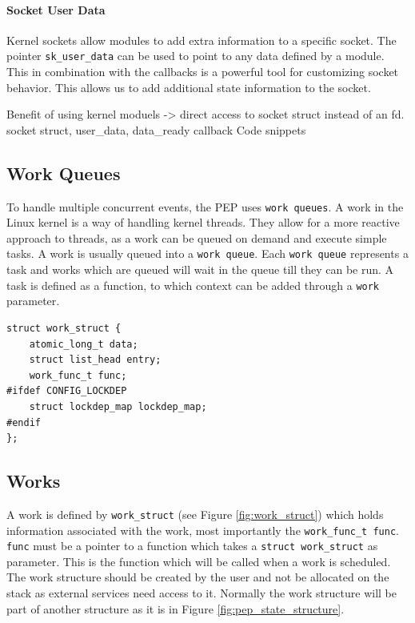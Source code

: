 \documentclass[a4paper,english, 11pt]{report}
\begin{document}
\paragraph{Socket User Data}
Kernel sockets allow modules to add extra information to a specific socket. The pointer \verb|sk_user_data| can be used to point to any data defined by a module. This in combination with the callbacks is a powerful tool for customizing socket behavior. This allows us to add additional state information to the socket.

Benefit of using kernel moduels -> direct access to socket struct instead of an fd.
socket struct, user\_data, data\_ready callback
Code snippets

\subsection{Work Queues}
To handle multiple concurrent events, the PEP uses \verb|work queues|. A work in the Linux kernel is a way of handling kernel threads. They allow for a more reactive approach to threads, as a work can be queued on demand and execute simple tasks. A work is usually queued into a \verb|work queue|. Each \verb|work queue| represents a task and works which are queued will wait in the queue till they can be run. A task is defined as a function, to which context can be added through a \verb|work| parameter.\\

\noindent\begin{minipage}{\linewidth}
\begin{verbatim}
struct work_struct {
    atomic_long_t data;
    struct list_head entry;
    work_func_t func;
#ifdef CONFIG_LOCKDEP
    struct lockdep_map lockdep_map;
#endif
};
\end{verbatim}
\label{fig:work_struct}
\end{minipage}

\subsection{Works}
A work is defined by \verb|work_struct| (see Figure \ref{fig:work_struct}) which holds information associated with the work, most importantly the \verb|work_func_t func|. \verb|func| must be a pointer to a function which takes a \verb|struct work_struct| as parameter. This is the function which will be called when a work is scheduled. The work structure should be created by the user and not be allocated on the stack as external services need access to it. Normally the work structure will be part of another structure as it is in Figure \ref{fig:pep_state_structure}.\\
\end{document}
